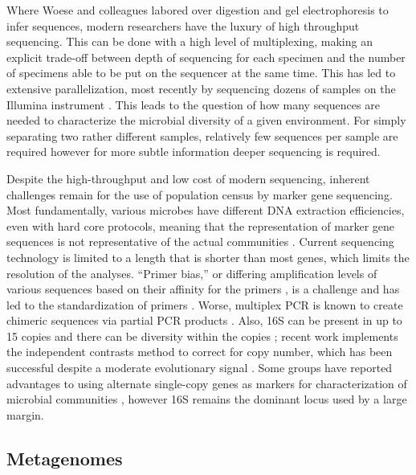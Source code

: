 \documentclass{amsart}
\begin{document}
Where Woese and colleagues labored over digestion and gel electrophoresis to infer sequences, modern researchers have the luxury of high throughput sequencing.
This can be done with a high level of multiplexing, making an explicit trade-off between depth of sequencing for each specimen and the number of specimens able to be put on the sequencer at the same time.
This has led to extensive parallelization, most recently by sequencing dozens of samples on the Illumina instrument \citep{degnan2011illumina,caporaso2012ultra}.
This leads to the question of how many sequences are needed to characterize the microbial diversity of a given environment.
For simply separating two rather different samples, relatively few sequences per sample are required \citep{kuczynski2010microbial} however for more subtle information deeper sequencing is required.

Despite the high-throughput and low cost of modern sequencing, inherent challenges remain for the use of population census by marker gene sequencing.
Most fundamentally, various microbes have different DNA extraction efficiencies, even with hard core protocols, meaning that the representation of marker gene sequences is not representative of the actual communities \citep{morgan2010metagenomic}.
Current sequencing technology is limited to a length that is shorter than most genes, which limits the resolution of the analyses.
``Primer bias,'' or differing amplification levels of various sequences based on their affinity for the primers \citep{suzuki1996bias,polz1998bias}, is a challenge and has led to the standardization of primers \citep{methe2012framework}.
Worse, multiplex PCR is known to create chimeric sequences via partial PCR products \citep{hugenholtz2003chimeric,ashelford2005least,haas2011chimeric,schloss2011reducing}.
Also, 16S can be present in up to 15 copies and there can be diversity within the copies \citep{klappenbach2001rrndb};
recent work \citep{kembel2012incorporating} implements the independent contrasts \citep{felsenstein1985phylogenies} method to correct for copy number, which has been successful despite a moderate evolutionary signal \citep{klappenbach2000rrna}.
Some groups have reported advantages to using alternate single-copy genes as markers for characterization of microbial communities \citep[e.g.][]{case2007rpob,mcnabb2004hsp65}, however 16S remains the dominant locus used by a large margin.


\subsection{Metagenomes}
\end{document}
